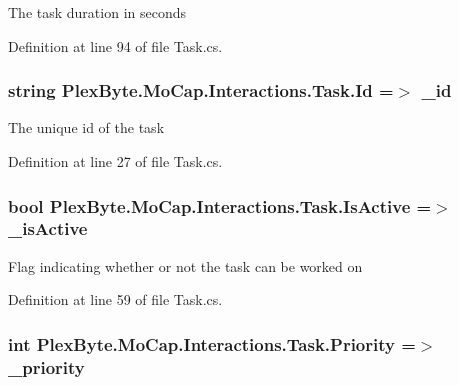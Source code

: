 The task duration in seconds 



Definition at line 94 of file Task.\+cs.

\subsubsection[{\texorpdfstring{Id}{Id}}]{\setlength{\rightskip}{0pt plus 5cm}string Plex\+Byte.\+Mo\+Cap.\+Interactions.\+Task.\+Id =$>$ \+\_\+id}\hypertarget{class_plex_byte_1_1_mo_cap_1_1_interactions_1_1_task_a56373e896c8d387f53b89c820b78686c}{}\label{class_plex_byte_1_1_mo_cap_1_1_interactions_1_1_task_a56373e896c8d387f53b89c820b78686c}


The unique id of the task 



Definition at line 27 of file Task.\+cs.

\subsubsection[{\texorpdfstring{Is\+Active}{IsActive}}]{\setlength{\rightskip}{0pt plus 5cm}bool Plex\+Byte.\+Mo\+Cap.\+Interactions.\+Task.\+Is\+Active =$>$ \+\_\+is\+Active}\hypertarget{class_plex_byte_1_1_mo_cap_1_1_interactions_1_1_task_a4e3e7f12d9ebbef619979f8aa1debaa9}{}\label{class_plex_byte_1_1_mo_cap_1_1_interactions_1_1_task_a4e3e7f12d9ebbef619979f8aa1debaa9}


Flag indicating whether or not the task can be worked on 



Definition at line 59 of file Task.\+cs.

\subsubsection[{\texorpdfstring{Priority}{Priority}}]{\setlength{\rightskip}{0pt plus 5cm}int Plex\+Byte.\+Mo\+Cap.\+Interactions.\+Task.\+Priority =$>$ \+\_\+priority}\hypertarget{class_plex_byte_1_1_mo_cap_1_1_interactions_1_1_task_a4b3325d26ed2025dd44f597a428cfdd0}{}\label{class_plex_byte_1_1_mo_cap_1_1_interactions_1_1_task_a4b3325d26ed2025dd44f597a428cfdd0}


